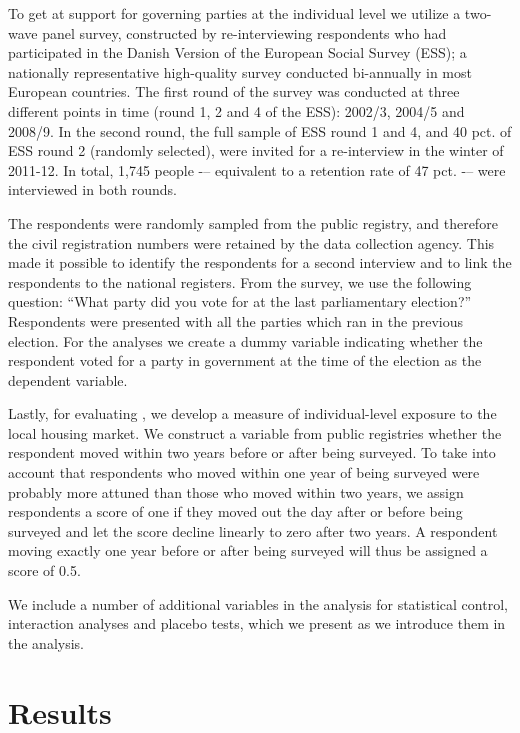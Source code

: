 \documentclass[12pt,a4paper]{article}
\begin{document}
	To get at support for governing parties at the individual level we utilize a two-wave panel survey, constructed by re-interviewing respondents who had participated in the Danish Version of the European Social Survey (ESS); a nationally representative high-quality survey conducted bi-annually in most European countries. The first round of the survey was conducted at three different points in time (round 1, 2 and 4 of the ESS): 2002/3, 2004/5 and 2008/9. In the second round, the full sample of ESS round 1 and 4, and 40 pct. of ESS round 2 (randomly selected), were invited for a re-interview in the winter of 2011-12. In total, 1,745 people -– equivalent to a retention rate of 47 pct. -– were interviewed in both rounds.
	
	The respondents were randomly sampled from the public registry, and therefore the civil registration numbers were retained by the data collection agency. This made it possible to identify the respondents for a second interview and to link the respondents to the national registers. From the survey, we use the following question: ``What party did you vote for at the last parliamentary election?'' Respondents were presented with all the parties which ran in the previous election. For the analyses we create a dummy variable indicating whether the respondent voted for a party in government at the time of the election as the dependent variable.
	
	Lastly, for evaluating \htwo, we develop a measure of individual-level exposure to the local housing market. We construct a variable from public registries whether the respondent moved within two years before or after being surveyed. To take into account that respondents who moved within one year of being surveyed were probably more attuned than those who moved within two years, we assign respondents a score of one if they moved out the day after or before being surveyed and let the score decline linearly to zero after two years. A respondent moving exactly one year before or after being surveyed will thus be assigned a score of 0.5. 
	
	We include a number of additional variables in the analysis for statistical control, interaction analyses and placebo tests, which we present as we introduce them in the analysis. 
	
	
	\section{Results}
			
\end{document}
